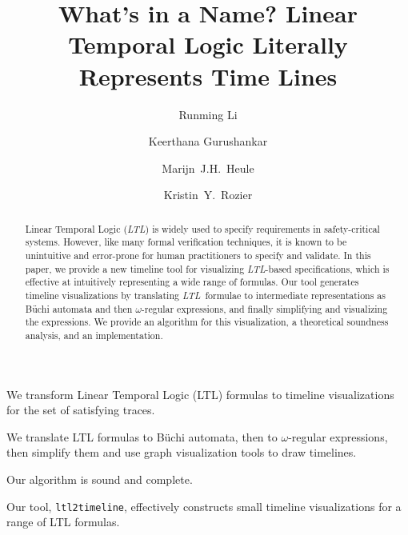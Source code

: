 \documentclass[preprint,12pt]{elsarticle}
\theoremstyle{definition}
\theoremstyle{remark}
\newcommand{\ltl}{\textit{LTL}}
\newcommand{\Buchi}{B\"{u}chi }
\begin{document}
\begin{frontmatter}
    \title{What's in a Name? Linear Temporal Logic Literally Represents Time Lines}

	\author[inst1]{Runming Li}

	\author[inst1]{Keerthana Gurushankar}

    \author[inst1]{Marijn~J.H.~Heule}

    \author[inst2]{Kristin~Y.~Rozier}




    \begin{abstract}
        Linear Temporal Logic (\ltl) is widely used to specify requirements in safety-critical systems.
        However, like many formal verification techniques, it is known to be unintuitive and error-prone for human practitioners to specify and validate.
        In this paper, we provide a new timeline tool for visualizing \ltl-based specifications, which is effective at intuitively representing a wide range of formulas.
        Our tool generates timeline visualizations by translating \ltl\ formulae to intermediate representations as \Buchi automata and then $\omega$-regular expressions, and finally simplifying and visualizing the expressions.
        We provide an algorithm for this visualization, a theoretical soundness analysis, and an implementation.
    \end{abstract}

    \begin{highlights}
        \item We transform Linear Temporal Logic (LTL) formulas to timeline visualizations for the set of satisfying traces.
        \item We translate LTL formulas to \Buchi automata, then to $\omega$-regular expressions, then simplify them and use graph visualization tools to draw timelines.
        \item Our algorithm is sound and complete.
        \item Our tool, \texttt{ltl2timeline}, effectively constructs small timeline visualizations for a range of LTL formulas.
    \end{highlights}


\end{frontmatter}
\end{document}
